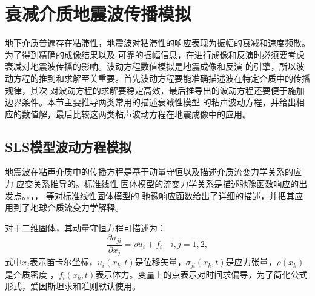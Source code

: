 \vspace{0.5cm}
\section{衰减介质地震波传播模拟}
\vspace{0.5cm}
地下介质普遍存在粘滞性，地震波对粘滞性的响应表现为振幅的衰减和速度频散。为了得到精确的成像结果以及
可靠的振幅信息，在进行成像和反演时必须要考虑衰减对地震波传播的影响。波动方程数值模拟是地震成像和反演
的引擎，所以波动方程的推到和求解至关重要。首先波动方程要能准确描述波在特定介质中的传播规律，其次
对波动方程的求解要稳定高效，最后推导出的波动方程还要便于施加边界条件。本节主要推导两类常用的描述衰减性模型
的粘声波动方程，并给出相应的数值解，最后比较这两类粘声波动方程在地震成像中的应用。

\subsection{SLS模型波动方程模拟}
地震波在粘声介质中的传播方程是基于动量守恒以及描述介质流变力学关系的应力-应变关系推导的。标准线性
固体模型的流变力学关系是描述驰豫函数响应的出发点。，，， 等对标准线性固体模型的
驰豫响应函数给出了详细的描述，并把其应用到了地球介质流变力学解释。

对于二维固体，其动量守恒方程可描述为：
\begin{equation}
	\frac{\partial\sigma_{ji}}{\partial x_j}=\rho\ddot{u}_i+f_i \quad i,j=1,2,
	\label{eq:dl}
\end{equation}
式中$x_j$表示笛卡尔坐标，$u_i(x_k,t)$是位移矢量，$\sigma_{ji}(x_k,t)$是应力张量，$\rho(x_k)$是介质密度
，$f_i(x_k,t)$表示体力。变量上的点表示对时间求偏导，为了简化公式形式，爱因斯坦求和准则默认使用。

